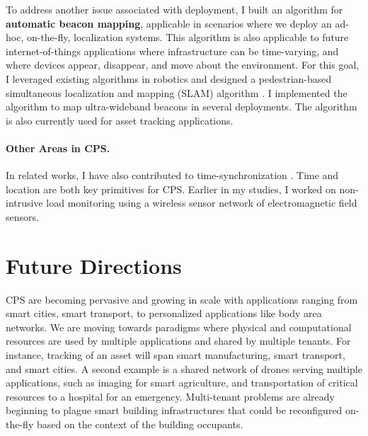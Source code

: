 \documentclass[10pt]{article}
\begin{document}
To address another issue associated with deployment, I built an algorithm for {\bf automatic beacon mapping}, applicable in scenarios where we deploy an ad-hoc, on-the-fly, localization systems. This algorithm is also applicable to future internet-of-things applications where infrastructure can be time-varying, and where devices appear, disappear, and move about the environment. %
For this goal, I leveraged existing algorithms in robotics and designed a pedestrian-based simultaneous localization and mapping (SLAM) algorithm \cite{mobileAR}. I implemented the algorithm to map ultra-wideband beacons in several deployments. The algorithm is also currently used for asset tracking applications.


\paragraph{Other Areas in CPS. }
In related works, I have also contributed to time-synchronization \cite{buevich2013hardware, dongare2017pulsar}. Time and location are both key primitives for CPS. 
Earlier in my studies, I worked on non-intrusive load monitoring \cite{rajagopal2013magnetic, rajagopal2013demo} using a wireless sensor network of electromagnetic field sensors. 

\section{Future Directions}

CPS are becoming pervasive and growing in scale with applications ranging from smart cities, smart transport, 
to personalized applications like body area networks.  %
We are moving towards 
paradigms where physical and computational resources are used by multiple applications and shared by multiple tenants.  For instance, tracking of an asset will span smart manufacturing, smart transport, and smart cities.  A second example is a shared network of drones serving multiple applications, such as imaging for smart agriculture, and transportation of critical resources to a hospital for an emergency. Multi-tenant problems are already beginning to plague smart building infrastructures that could %
be reconfigured on-the-fly based on the context of the building occupants. %
\end{document}
